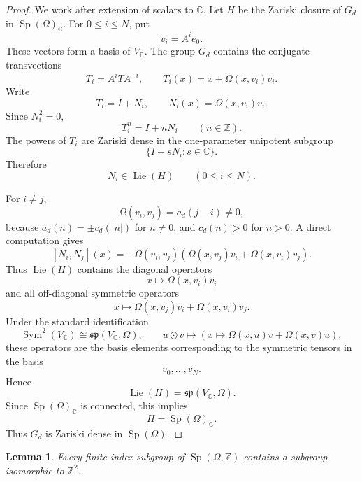 \documentclass[a4paper,11pt]{amsart}
\newtheorem{lemma}[theorem]{Lemma}
\theoremstyle{remark}
\newcommand{\Z}{\mathbb Z}
\newcommand{\C}{\mathbb C}
\DeclareMathOperator{\Sp}{Sp}
\DeclareMathOperator{\Lie}{Lie}
\numberwithin{equation}{section}
\begin{document}
\begin{proof}
We work after extension of scalars to \(\C\).  Let \(H\) be the Zariski closure of \(G_d\) in \(\Sp(\Omega)_\C\).  For \(0\le i\le N\), put
\[
        v_i=A^ie_0.
\]
These vectors form a basis of \(V_\C\).  The group \(G_d\) contains the conjugate transvections
\[
        T_i=A^iTA^{-i},
        \qquad
        T_i(x)=x+\Omega(x,v_i)v_i.
\]
Write
\[
        T_i=I+N_i,
        \qquad
        N_i(x)=\Omega(x,v_i)v_i.
\]
Since \(N_i^2=0\),
\[
        T_i^n=I+nN_i
        \qquad(n\in\Z).
\]
The powers of \(T_i\) are Zariski dense in the one-parameter unipotent subgroup
\[
        \{I+sN_i:s\in\C\}.
\]
Therefore
\[
        N_i\in\Lie(H)
        \qquad(0\le i\le N).
\]

For \(i\ne j\),
\[
        \Omega(v_i,v_j)=a_d(j-i)\ne0,
\]
because \(a_d(n)=\pm c_d(|n|)\) for \(n\ne0\), and \(c_d(n)>0\) for \(n>0\).  A direct computation gives
\[
        [N_i,N_j](x)
        =
        -\Omega(v_i,v_j)
        \left(
        \Omega(x,v_j)v_i+\Omega(x,v_i)v_j
        \right).
\]
Thus \(\Lie(H)\) contains the diagonal operators
\[
        x\mapsto \Omega(x,v_i)v_i
\]
and all off-diagonal symmetric operators
\[
        x\mapsto \Omega(x,v_j)v_i+\Omega(x,v_i)v_j.
\]
Under the standard identification
\[
        \operatorname{Sym}^2(V_\C)\cong\mathfrak{sp}(V_\C,\Omega),
        \qquad
        u\odot v\mapsto
        \left(x\mapsto \Omega(x,u)v+\Omega(x,v)u\right),
\]
these operators are the basis elements corresponding to the symmetric tensors in the basis
\[
        v_0,\ldots,v_N.
\]
Hence
\[
        \Lie(H)=\mathfrak{sp}(V_\C,\Omega).
\]
Since \(\Sp(\Omega)_\C\) is connected, this implies
\[
        H=\Sp(\Omega)_\C.
\]
Thus \(G_d\) is Zariski dense in \(\Sp(\Omega)\).
\end{proof}

\begin{lemma}\label{lem:ambient-Z2}
Every finite-index subgroup of \(\Sp(\Omega,\Z)\) contains a subgroup isomorphic to \(\Z^2\).
\end{lemma}
\end{document}
